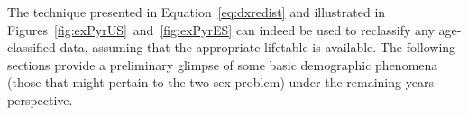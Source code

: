  \FloatBarrier
The technique presented in Equation~\eqref{eq:dxredist} and illustrated in
Figures~\ref{fig:exPyrUS}~and~\ref{fig:exPyrES} can indeed be used to reclassify
any age-classified data, assuming that the appropriate lifetable is available.
The following sections provide a preliminary glimpse of some basic demographic
phenomena (those that might pertain to the two-sex problem) under the
remaining-years perspective.
